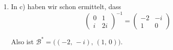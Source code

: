 \documentclass[a4paper,12pt]{article}
\begin{document}
\begin{enumerate}[label=\alph*)]
\[
  {}_{\mathcal{B}}M_{\mathcal{B}}(f)
  = \begin{pmatrix} -2 & -i \\ 1 & 0 \end{pmatrix}
    \begin{pmatrix} 1 & 1 \\ 1+i & -1 \end{pmatrix}
    \begin{pmatrix} 0 & 1 \\ i & 2i \end{pmatrix}
  = \begin{pmatrix} -2 & -i \\ 1 & 0 \end{pmatrix}
    \begin{pmatrix} i & 1+2i \\ -i & 1-i \end{pmatrix}
  = \begin{pmatrix} -1-2i & 1-5i \\ i & 1+2i \end{pmatrix}
\]

\item In c) haben wir schon ermittelt, dass
\[
  \begin{pmatrix} 0 & 1 \\ i & 2i \end{pmatrix}^{-1} = \begin{pmatrix} -2 & -i \\ 1 & 0 \end{pmatrix}
\]

Also ist $\mathcal{B}^* = \bigl((-2,\,-i),\,(1,\,0)\bigr)$.

\end{enumerate}
\end{document}
